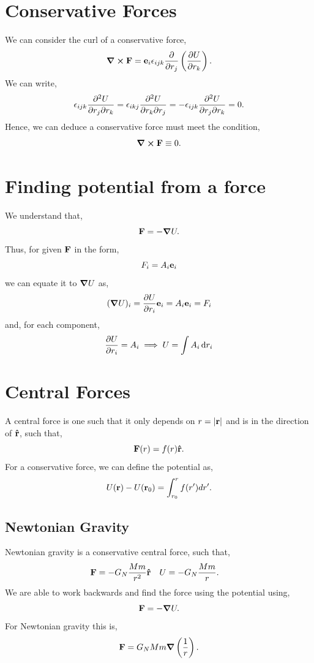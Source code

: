 \documentclass{book}
\begin{document}
\section{Conservative Forces}
We can consider the curl of a conservative force,
\begin{equation}
    \grad \cross \vb{F} = \vb{e}_i\epsilon_{ijk}\pdv{}{r_j}\left(\pdv{U}{r_k}\right).
\end{equation}
We can write,
\begin{equation}
    \epsilon_{ijk}\pdv{U}{r_j}{r_k} = \epsilon_{ikj}\pdv{U}{r_k}{r_j} = -\epsilon_{ijk}\pdv{U}{r_j}{r_k} = 0.
\end{equation}
Hence, we can deduce a conservative force must meet the condition,
\begin{equation}
    \grad \cross \vb{F} \equiv 0.
\end{equation}
\section{Finding potential from a force}
We understand that,
\begin{equation}
    \vb{F} = -\grad U.
\end{equation}
Thus, for given $\vb{F}$ in the form,
\begin{equation}
    F_i = A_i\vb{e}_i
\end{equation}
we can equate it to $\grad U$ as,
\begin{equation}
    (\grad U)_i = \pdv{U}{r_i}\vb{e}_i = A_i\vb{e}_i = F_i
\end{equation}
and, for each component,
\begin{equation}
    \pdv{U}{r_i} = A_i \implies U = \int A_i\dd{r_i}
\end{equation}
\section{Central Forces}
A central force is one such that it only depends on $r = |\vb{r}|$ and is in the direction of $\vu{r}$, such that,
\begin{equation}
    \vb{F}(r) = f(r)\vu{r}.
\end{equation}
For a conservative force, we can define the potential as,
\begin{equation}
    U(\vb{r}) - U(\vb{r}_0) = \int_{r_0}^r f(r')dr'.
\end{equation}
\subsection{Newtonian Gravity}
Newtonian gravity is a conservative central force, such that,
\begin{align}
    \vb{F}&=-G_N\frac{Mm}{r^2}\vu{r} & U&=-G_N\frac{Mm}{r}.
\end{align}
We are able to work backwards and find the force using the potential using,
\begin{equation}
    \vb{F} = -\grad U.
\end{equation}
For Newtonian gravity this is,
\begin{equation}
    \vb{F} = G_N Mm\grad \left(\frac{1}{r}\right). 
\end{equation}
\end{document}
